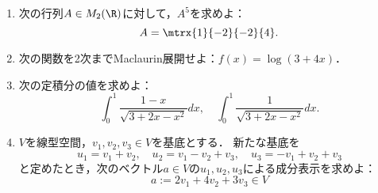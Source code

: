 \documentclass[uplatex,dvipdfmx]{jsarticle}
\begin{document}
\begin{tcolorbox}[colframe=ForestGreen, colback=ForestGreen!10!white,breakable,colbacktitle=ForestGreen!40!white,coltitle=black,fonttitle=\bfseries\sffamily,
    title=第１問]
    \begin{enumerate}
        \item 次の行列$A\in M_2(\R)$に対して，$A^5$を求めよ：
        \[A=\mtrx{1}{-2}{-2}{4}.\]
        \item 次の関数を2次までMaclaurin展開せよ：$f(x)=\log(3+4x)$．
        \item 次の定積分の値を求めよ：
        \[\int^1_0\frac{1-x}{\sqrt{3+2x-x^2}}dx,\quad\int^1_0\frac{1}{\sqrt{3+2x-x^2}}dx.\]
        \item $V$を線型空間，$v_1,v_2,v_3\in V$を基底とする．
        新たな基底を
        \[u_1=v_1+v_2,\quad u_2=v_1-v_2+v_3,\quad u_3=-v_1+v_2+v_3\]
        と定めたとき，次のベクトル$a\in V$の$u_1,u_2,u_3$による成分表示を求めよ：
        \[a:=2v_1+4v_2+3v_3\in V\]
    \end{enumerate}
\end{tcolorbox}
\end{document}
